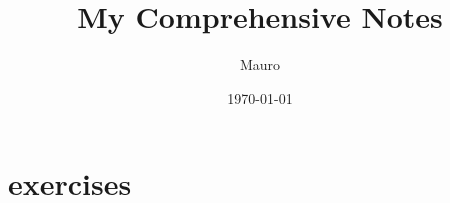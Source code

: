 \documentclass[12pt, a4paper]{report}
\title{My Comprehensive Notes}
\author{Mauro}
\date{\today}
\begin{document}

% 


% 
% 
% 

\chapter{exercises}
% 

\end{document}
